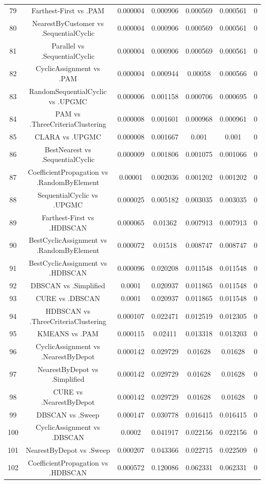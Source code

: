 \documentclass[a4paper,10pt]{article}
\begin{document}
\begin{landscape}
\begin{table}[!htp]
\begin{tabular}{ccccccc}
79&Farthest-First vs .PAM&0.000004&0.000906&0.000569&0.000561&0\\
80&NearestByCustomer vs .SequentialCyclic&0.000004&0.000906&0.000569&0.000561&0\\
81&Parallel vs .SequentialCyclic&0.000004&0.000906&0.000569&0.000561&0\\
82&CyclicAssignment vs .PAM&0.000004&0.000944&0.00058&0.000566&0\\
83&RandomSequentialCyclic vs .UPGMC&0.000006&0.001158&0.000706&0.000695&0\\
84&PAM vs .ThreeCriteriaClustering&0.000008&0.001601&0.000968&0.000961&0\\
85&CLARA vs .UPGMC&0.000008&0.001667&0.001&0.001&0\\
86&BestNearest vs .SequentialCyclic&0.000009&0.001806&0.001075&0.001066&0\\
87&CoefficientPropagation vs .RandomByElement&0.00001&0.002036&0.001202&0.001202&0\\
88&SequentialCyclic vs .UPGMC&0.000025&0.005182&0.003035&0.003035&0\\
89&Farthest-First vs .HDBSCAN&0.000065&0.01362&0.007913&0.007913&0\\
90&BestCyclicAssignment vs .RandomByElement&0.000072&0.01518&0.008747&0.008747&0\\
91&BestCyclicAssignment vs .HDBSCAN&0.000096&0.020208&0.011548&0.011548&0\\
92&DBSCAN vs .Simplified&0.0001&0.020937&0.011865&0.011548&0\\
93&CURE vs .DBSCAN&0.0001&0.020937&0.011865&0.011548&0\\
94&HDBSCAN vs .ThreeCriteriaClustering&0.000107&0.022471&0.012519&0.012305&0\\
95&KMEANS vs .PAM&0.000115&0.02411&0.013318&0.013203&0\\
96&CyclicAssignment vs .NearestByDepot&0.000142&0.029729&0.01628&0.01628&0\\
97&NearestByDepot vs .Simplified&0.000142&0.029729&0.01628&0.01628&0\\
98&CURE vs .NearestByDepot&0.000142&0.029729&0.01628&0.01628&0\\
99&DBSCAN vs .Sweep&0.000147&0.030778&0.016415&0.016415&0\\
100&CyclicAssignment vs .DBSCAN&0.0002&0.041917&0.022156&0.022156&0\\
101&NearestByDepot vs .Sweep&0.000207&0.043366&0.022715&0.022509&0\\
102&CoefficientPropagation vs .HDBSCAN&0.000572&0.120086&0.062331&0.062331&0\\

\end{tabular}
\end{table}
\end{landscape}
\end{document}
